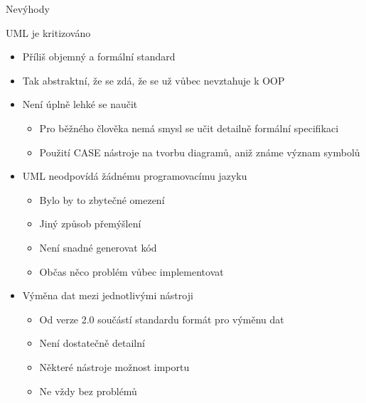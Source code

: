 \begin{frame}{Nevýhody}

\onslide<+-> UML je kritizováno

\begin{itemize}[<+->]
	\item Příliš objemný a formální standard
	\item Tak abstraktní, že se zdá, že se už vůbec nevztahuje k OOP
	\item Není úplně lehké se naučit
	\begin{itemize}
		\item Pro běžného člověka nemá smysl se učit detailně formální
		specifikaci
		\item Použití CASE nástroje na tvorbu diagramů, aniž známe 
		význam symbolů
	\end{itemize}	
	
	\item UML neodpovídá žádnému programovacímu jazyku
	\begin{itemize}
		\item Bylo by to zbytečné omezení
		\item Jiný způsob přemýšlení
		\item Není snadné generovat kód
		\item Občas něco problém vůbec implementovat
	\end{itemize}
	
	\item Výměna dat mezi jednotlivými nástroji
	\begin{itemize}
		\item Od verze 2.0 součástí standardu formát pro výměnu dat
		\item Není dostatečně detailní
		\item Některé nástroje možnost importu
		\item Ne vždy bez problémů
	\end{itemize}
\end{itemize}


\end{frame}


